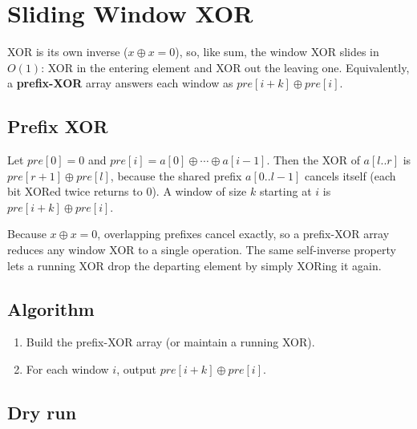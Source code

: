 \section{Sliding Window XOR}
\label{sec:cses-sw-xor}


\begin{patternbox}
XOR is its own inverse ($x\oplus x=0$), so, like sum, the window XOR slides
in $O(1)$: XOR in the entering element and XOR out the leaving one.
Equivalently, a \textbf{prefix-XOR} array answers each window as
$\textit{pre}[i+k]\oplus\textit{pre}[i]$.
\end{patternbox}

\subsection*{Prefix XOR}

Let $\textit{pre}[0]=0$ and $\textit{pre}[i]=a[0]\oplus\cdots\oplus
a[i-1]$. Then the XOR of $a[l..r]$ is $\textit{pre}[r+1]\oplus
\textit{pre}[l]$, because the shared prefix $a[0..l-1]$ cancels itself
(each bit XORed twice returns to $0$). A window of size $k$ starting at $i$
is $\textit{pre}[i+k]\oplus\textit{pre}[i]$.

\begin{ideabox}
Because $x\oplus x=0$, overlapping prefixes cancel exactly, so a
prefix-XOR array reduces any window XOR to a single operation. The same
self-inverse property lets a running XOR drop the departing element by
simply XORing it again.
\end{ideabox}

\subsection*{Algorithm}

\begin{enumerate}
  \item Build the prefix-XOR array (or maintain a running XOR).
  \item For each window $i$, output
        $\textit{pre}[i+k]\oplus\textit{pre}[i]$.
\end{enumerate}

\subsection*{Dry run}

